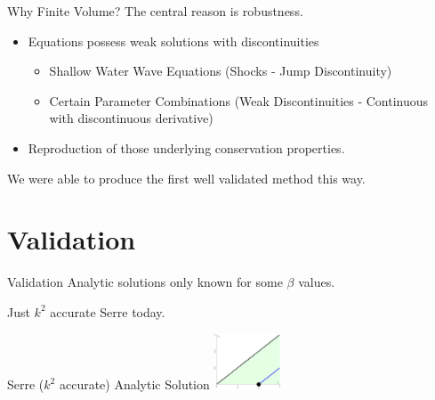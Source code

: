 \documentclass[pdf]{beamer}
\begin{document}
\begin{frame}{Why Finite Volume?}
The central reason is robustness.
\begin{itemize}
	\item Equations possess weak solutions with discontinuities 
	\begin{itemize}
	\item Shallow Water Wave Equations (Shocks - Jump Discontinuity)
	\item Certain Parameter Combinations (Weak Discontinuities - Continuous with discontinuous derivative)
	\end{itemize}
	\item Reproduction of those underlying conservation properties.
\end{itemize}
We were able to produce the first well validated method this way. 
\end{frame}


\section{Validation}
\begin{frame}{Validation}
Analytic solutions only known for some $\beta$ values. 

\bigskip
Just $k^2$ accurate Serre today.
\end{frame}

\begin{frame}{
	Serre ($k^2$ accurate) Analytic Solution \hfill \hfill \hfill \hfill \includegraphics[width=2cm]{./Pics/Tex/Explanatory/MiniRegions/Serre.pdf}}
\begin{figure}
	\centering

\end{figure}
\end{frame}
\end{document}
